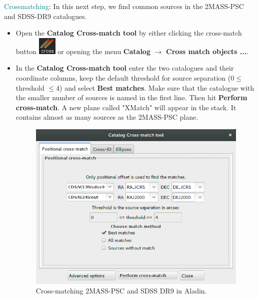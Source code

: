 \documentclass [a4paper, 12pt]{article}
\newcommand{\aladin}{{\textsc{A}{ladin}}}
\begin{document}
\noindent \textcolor{teal}{Crossmatching}: In this next step, we find common 
sources in 
the 2MASS-PSC and SDSS-DR9 catalogues. 
\begin{itemize}
    \item Open the \textbf{Catalog Cross-match tool} by either clicking the 
    cross-match button \includegraphics[width=0.03 
    \textwidth]{../images/aladin_button_crossmatch.png} or opening the menu 
    \textbf{Catalog} $\rightarrow$ \textbf{Cross match objects ...}. 
    \item In the \textbf{Catalog Cross-match tool} enter the two catalogues and 
    their coordinate columns, keep the default threshold for source separation 
    ($0 \le $ threshold $\le 4$) and select \textbf{Best matches}. Make sure 
    that the catalogue with the smaller number of sources is named in the first 
    line. Then hit \textbf{Perform cross-match}. A new plane called "XMatch" 
    will appear in the stack. It contains almost as many sources as the 
    2MASS-PSC plane. 
    \begin{figure}[H]
        \center
        \includegraphics[width=0.5 
        \textwidth]{../images/aladin_crossmatch_sdss-2mass.png}
        \caption{Cross-matching 2MASS-PSC and SDSS DR9 in \aladin.}
        \label{fig:crossmatch_2mass_sdss_aladin}
    \end{figure}
\end{itemize}
\end{document}
